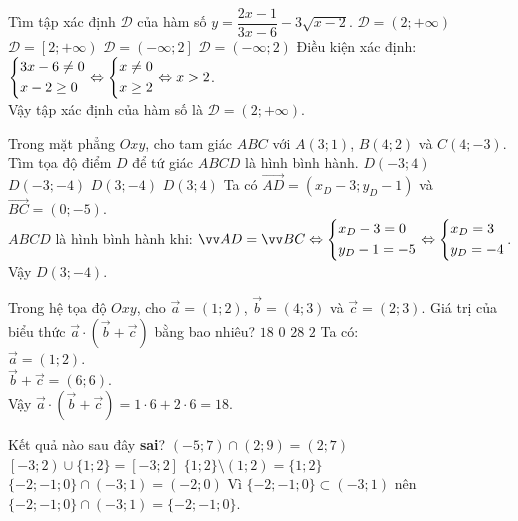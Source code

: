 \begin{ex}%
 Tìm tập xác định $\mathscr{D}$ của hàm số $y = \dfrac{2x-1}{3x-6} - 3\sqrt{x-2}$.
 \choice
  {\True $\mathscr{D} = (2; +\infty)$}
  {$\mathscr{D} = \left[2; +\infty \right)$}
  {$\mathscr{D} = \left(-\infty; 2\right]$}
  {$\mathscr{D} = (-\infty; 2)$}
 \loigiai
 {
 Điều kiện xác định: $\left\{\begin{aligned}& 3x-6 \neq 0 \\& x-2 \geq 0\end{aligned}\right. \Leftrightarrow \left\{\begin{aligned}& x \neq 0 \\& x \geq 2\end{aligned}\right. \Leftrightarrow x > 2$.\\
 Vậy tập xác định của hàm số là $\mathscr{D} = (2; +\infty)$.
 }
\end{ex}


\begin{ex}%
 Trong mặt phẳng $Oxy$, cho tam giác $ABC$ với $A(3;1)$, $B(4;2)$ và $C(4;-3)$. Tìm tọa độ điểm $D$ để tứ giác $ABCD$ là hình bình hành.
 \choice
  {$D(-3;4)$}
  {$D(-3;-4)$}
  {\True $D(3;-4)$}
  {$D(3;4)$}
 \loigiai
 {
 Ta có $\vec{AD} = (x_D - 3; y_D - 1)$ và $\vec{BC} = (0;-5)$.\\
  $ABCD$ là hình bình hành khi: $\vec{AD} = \vec{BC} \Leftrightarrow \heva{& x_D - 3 = 0 \\& y_D - 1 = -5} \Leftrightarrow \heva{& x_D = 3 \\& y_D = -4}$.
  Vậy $D(3;-4)$.\\
 }
\end{ex}


\begin{ex}%
 Trong hệ tọa độ $Oxy$, cho $\vec{a} = (1;2)$, $\vec{b} = (4;3)$ và $\vec{c} = (2;3)$. Giá trị của biểu thức $\vec{a} \cdot \left( \vec{b} + \vec{c} \right)$ bằng bao nhiêu?
 \choice
  {\True $18$}
  {$0$}
  {$28$}
  {$2$}
 \loigiai
 {
 Ta có:\\
 $\vec{a} = (1;2)$.\\
 $\vec{b} + \vec{c} = (6;6)$.\\
 Vậy $\vec{a} \cdot \left( \vec{b} + \vec{c} \right) = 1 \cdot 6 + 2 \cdot 6 = 18$.
 }
\end{ex}


\begin{ex}%
 Kết quả nào sau đây \textbf{sai}?
 \choice
  {$(-5;7) \cap (2;9) = (2;7)$}
  {$\left[-3;2\right) \cup \{1;2\} = [-3;2]$}
  {$\{1;2\} \setminus (1;2) = \{1;2\}$}
  {\True $\{-2;-1;0\} \cap (-3;1) = (-2;0)$}
 \loigiai
 {
 Vì $\{-2;-1;0\} \subset (-3;1)$ nên $\{-2;-1;0\} \cap (-3;1) = \{-2;-1;0\}$.
 }
\end{ex}


